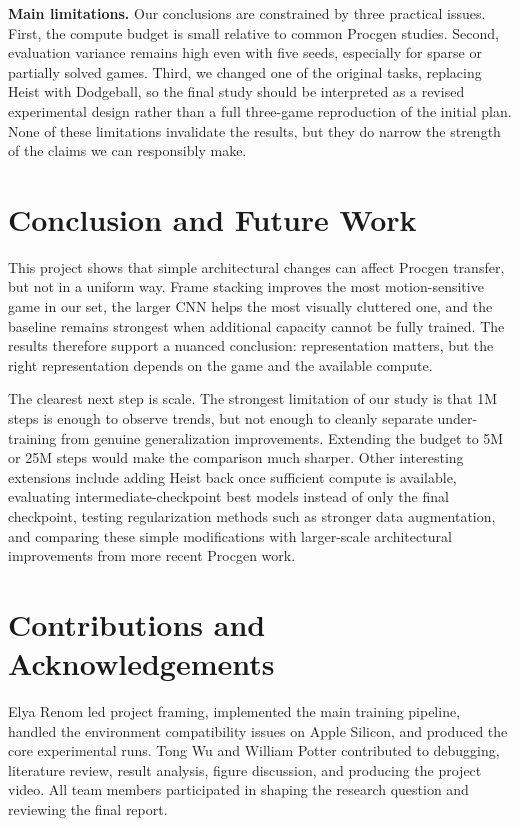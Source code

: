 \documentclass[10pt,twocolumn]{article}
\begin{document}
\textbf{Main limitations.} Our conclusions are constrained by three practical issues. First, the compute budget is small relative to common Procgen studies. Second, evaluation variance remains high even with five seeds, especially for sparse or partially solved games. Third, we changed one of the original tasks, replacing Heist with Dodgeball, so the final study should be interpreted as a revised experimental design rather than a full three-game reproduction of the initial plan. None of these limitations invalidate the results, but they do narrow the strength of the claims we can responsibly make.

\section{Conclusion and Future Work}
This project shows that simple architectural changes can affect Procgen transfer, but not in a uniform way. Frame stacking improves the most motion-sensitive game in our set, the larger CNN helps the most visually cluttered one, and the baseline remains strongest when additional capacity cannot be fully trained. The results therefore support a nuanced conclusion: representation matters, but the right representation depends on the game and the available compute.

The clearest next step is scale. The strongest limitation of our study is that 1M steps is enough to observe trends, but not enough to cleanly separate under-training from genuine generalization improvements. Extending the budget to 5M or 25M steps would make the comparison much sharper. Other interesting extensions include adding Heist back once sufficient compute is available, evaluating intermediate-checkpoint best models instead of only the final checkpoint, testing regularization methods such as stronger data augmentation, and comparing these simple modifications with larger-scale architectural improvements from more recent Procgen work.

\section{Contributions and Acknowledgements}
Elya Renom led project framing, implemented the main training pipeline, handled the environment compatibility issues on Apple Silicon, and produced the core experimental runs. Tong Wu and William Potter contributed to debugging, literature review, result analysis, figure discussion, and producing the project video. All team members participated in shaping the research question and reviewing the final report.
\end{document}
